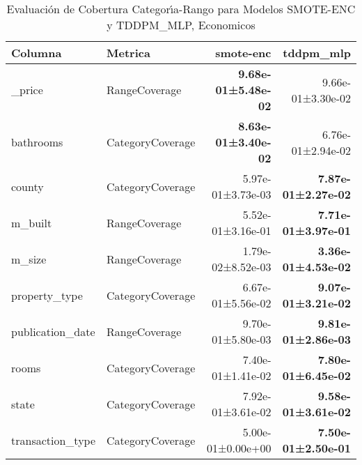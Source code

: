 \begin{table}[H]
\centering
\fontsize{10}{14}\selectfont
\caption{Evaluaci\'on de Cobertura Categor{\'\i}a-Rango para Modelos SMOTE-ENC y TDDPM\_MLP, Economicos}
\label{table-coverage-economicos-a}
\begin{tabular}{|l|l|r|r|}
\hline
\rowcolor[gray]{0.8}
Columna & Metrica & smote-enc & tddpm\_mlp \\
\hline \_price & RangeCoverage & \bfseries 9.68e-01±5.48e-02 & 9.66e-01±3.30e-02 \\
\hline bathrooms & CategoryCoverage & \bfseries 8.63e-01±3.40e-02 & 6.76e-01±2.94e-02 \\
\hline county & CategoryCoverage & 5.97e-01±3.73e-03 & \bfseries 7.87e-01±2.27e-02 \\
\hline m\_built & RangeCoverage & 5.52e-01±3.16e-01 & \bfseries 7.71e-01±3.97e-01 \\
\hline m\_size & RangeCoverage & \cellcolor[rgb]{0.9, 0.54, 0.52} 1.79e-02±8.52e-03 & \cellcolor[rgb]{0.9, 0.54, 0.52} \bfseries 3.36e-01±4.53e-02 \\
\hline property\_type & CategoryCoverage & 6.67e-01±5.56e-02 & \bfseries 9.07e-01±3.21e-02 \\
\hline publication\_date & RangeCoverage & 9.70e-01±5.80e-03 & \bfseries 9.81e-01±2.86e-03 \\
\hline rooms & CategoryCoverage & 7.40e-01±1.41e-02 & \bfseries 7.80e-01±6.45e-02 \\
\hline state & CategoryCoverage & 7.92e-01±3.61e-02 & \bfseries 9.58e-01±3.61e-02 \\
\hline transaction\_type & CategoryCoverage & 5.00e-01±0.00e+00 & \bfseries 7.50e-01±2.50e-01 \\
\hline
\end{tabular}
\end{table}
